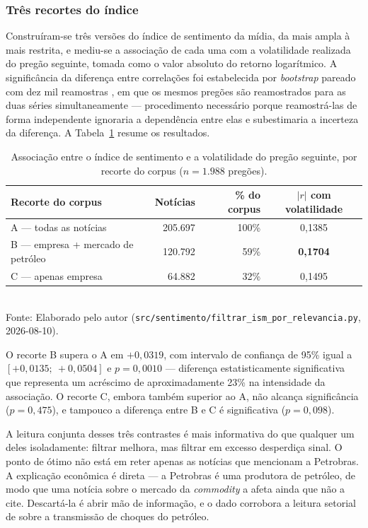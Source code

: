 \subsubsection{Três recortes do índice}

Construíram-se três versões do índice de sentimento da mídia, da mais ampla à mais restrita, e
mediu-se a associação de cada uma com a volatilidade realizada do pregão seguinte, tomada como
o valor absoluto do retorno logarítmico. A significância da diferença entre correlações foi
estabelecida por \textit{bootstrap} pareado com dez mil reamostras \cite{efron_bootstrap_1992}, em
que os mesmos pregões são reamostrados para as duas séries simultaneamente --- procedimento
necessário porque reamostrá-las de forma independente ignoraria a dependência entre elas e
subestimaria a incerteza da diferença. A Tabela~\ref{tab:recortes_ism} resume os resultados.

\begin{table}[htpb]
\centering
\caption{Associação entre o índice de sentimento e a volatilidade do pregão seguinte, por recorte do corpus ($n = 1.988$ pregões).}
\label{tab:recortes_ism}
\begin{tabular}{l r r c}
\hline
\textbf{Recorte do corpus} & \textbf{Notícias} & \textbf{\% do corpus} & \textbf{$|r|$ com volatilidade} \\ \hline
A --- todas as notícias & 205.697 & 100\% & 0,1385 \\
B --- empresa + mercado de petróleo & 120.792 & 59\% & \textbf{0,1704} \\
C --- apenas empresa & 64.882 & 32\% & 0,1495 \\
\hline
\end{tabular}
\vspace{0.2cm}
{\small \\ Fonte: Elaborado pelo autor (\texttt{src/sentimento/filtrar\_ism\_por\_relevancia.py}, 2026-08-10).}
\end{table}

O recorte B supera o A em $+0{,}0319$, com intervalo de confiança de 95\% igual a
$[+0{,}0135;\ +0{,}0504]$ e $p = 0{,}0010$ --- diferença estatisticamente significativa que
representa um acréscimo de aproximadamente 23\% na intensidade da associação. O recorte C, embora
também superior ao A, não alcança significância ($p = 0{,}475$), e tampouco a diferença entre B e C
é significativa ($p = 0{,}098$).

A leitura conjunta desses três contrastes é mais informativa do que qualquer um deles isoladamente:
filtrar melhora, mas filtrar em excesso desperdiça sinal. O ponto de ótimo não está em reter apenas
as notícias que mencionam a Petrobras. A explicação econômica é direta --- a Petrobras é uma
produtora de petróleo, de modo que uma notícia sobre o mercado da \textit{commodity} a afeta ainda
que não a cite. Descartá-la é abrir mão de informação, e o dado corrobora a leitura setorial de
 sobre a transmissão de choques do petróleo.

